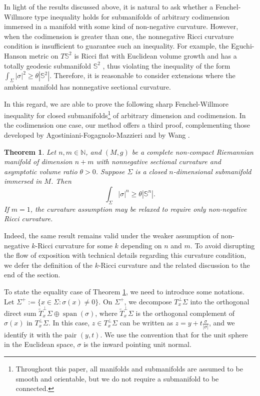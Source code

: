 \documentclass[11pt, reqno]{amsart}
\newtheorem{theorem}{Theorem}[section]
\numberwithin{equation}{section}
\begin{document}
In light of the results discussed above, it is natural to ask whether a Fenchel-Willmore type inequality holds for submanifolds of arbitrary codimension immersed in a manifold with some kind of non-negative curvature. However, when the codimension is greater than one, the nonnegative Ricci curvature condition is insufficient to guarantee such an inequality. For example, the Eguchi-Hanson metric on $T \mathbb S^2$ is Ricci flat with Euclidean volume growth and has a totally geodesic submanifold $\mathbb S^2$ \cite[p. 270]{Anderson1990}, thus violating the inequality of the form $\int_\Sigma|\sigma|^2 \ge \theta |\mathbb S^2|$. Therefore, it is reasonable to consider extensions where the ambient manifold has nonnegative sectional curvature.

In this regard, we are able to prove the following sharp Fenchel-Willmore inequality for closed submanifolds\footnote{Throughout this paper, all manifolds and submanifolds are assumed to be smooth and orientable, but we do not require a submanifold to be connected.} of arbitrary dimension and codimension. In the codimension one case, our method offers a third proof, complementing those developed by Agostiniani-Fogagnolo-Mazzieri \cite{Agostiniani-Fogagnolo-Mazzieri} and by Wang \cite{Wang23}.

\begin{theorem}\label{thm general fenchel willmore}
Let $n, m \in \mathbb{N}$, and $(M, g)$ be a complete non-compact Riemannian manifold of dimension $n+m$ with nonnegative sectional curvature and asymptotic volume ratio $\theta>0$. Suppose $\Sigma$ is a closed $n$-dimensional submanifold immersed in $M$. Then
\begin{equation}\label{ineq fenchel willmore}
\int_{\Sigma}|\sigma|^n \ge \theta|\mathbb S^n|.
\end{equation}
If $m=1$, the curvature assumption may be relaxed to require only non-negative Ricci curvature.
\end{theorem}

Indeed, the same result remains valid under the weaker assumption of non-negative $k$-Ricci curvature for some $k$ depending on $n$ and $m$. To avoid disrupting the flow of exposition with technical details regarding this curvature condition, we defer the definition of the $k$-Ricci curvature and the related discussion to the end of the section.

To state the equality case of Theorem \ref{thm general fenchel willmore}, we need to introduce some notations. Let $\Sigma^+:=\{x\in \Sigma: \sigma(x)\ne0\}$.
On $\Sigma^{+}$, we decompose $T_x^{\perp} \Sigma$ into the orthogonal direct sum $\widetilde{T}_x^{\perp} \Sigma \oplus \operatorname{span}(\sigma)$, where $\widetilde{T}_x^{\perp} \Sigma$ is the orthogonal complement of $\sigma(x)$ in $T_x^{\perp} \Sigma$. In this case, $z \in T_x^{\perp} \Sigma$ can be written as $z=y+t \frac{\sigma}{|\sigma|}$, and we identify it with the pair $(y, t)$. We use the convention that for the unit sphere in the Euclidean space, $\sigma$ is the inward pointing unit normal.
\end{document}
